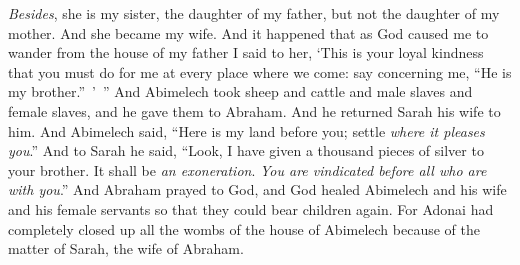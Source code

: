\begin{biblechapter}
\verse \textit{Besides}, she is my sister, the daughter of my father, but not the daughter of my mother. And she became my wife.
\verse And it happened that as God caused me to wander from the house of my father I said to her, ‘This is your loyal kindness that you must do for me at every place where we come: say concerning me, “He is my brother.” ’ ”
\verse And Abimelech took sheep and cattle and male slaves and female slaves, and he gave them to Abraham. And he returned Sarah his wife to him.
\verse And Abimelech said, “Here is my land before you; settle \textit{where it pleases you}.”
\verse And to Sarah he said, “Look, I have given a thousand pieces of silver to your brother. It shall be \textit{an exoneration}. \textit{You are vindicated before all who are with you}.”
\verse And Abraham prayed to God, and God healed Abimelech and his wife and his female servants so that they could bear children again.
\verse For Adonai had completely closed up all the wombs of the house of Abimelech because of the matter of Sarah, the wife of Abraham.
\end{biblechapter}

